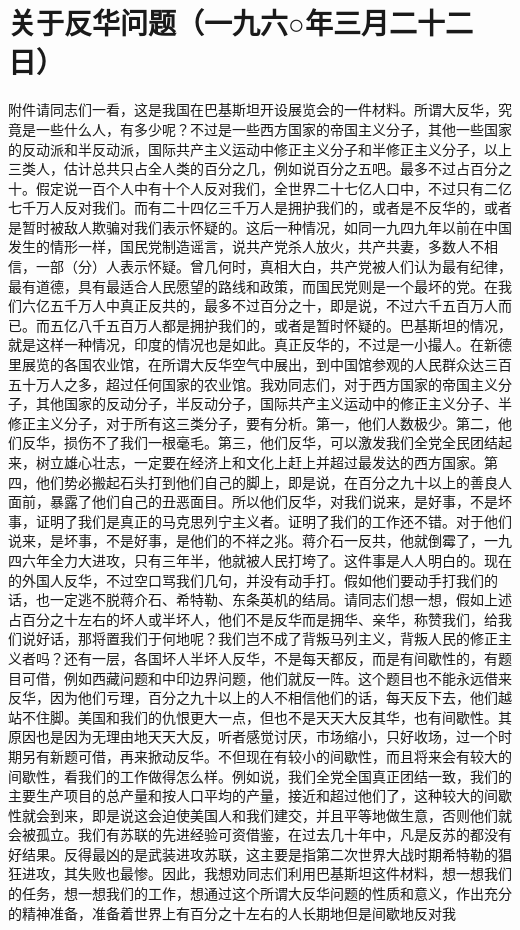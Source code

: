 \section[关于反华问题（一九六○年三月二十二日）]{关于反华问题（一九六○年三月二十二日）}


附件请同志们一看，这是我国在巴基斯坦开设展览会的一件材料。所谓大反华，究竟是一些什么人，有多少呢？不过是一些西方国家的帝国主义分子，其他一些国家的反动派和半反动派，国际共产主义运动中修正主义分子和半修正主义分子，以上三类人，估计总共只占全人类的百分之几，例如说百分之五吧。最多不过占百分之十。假定说一百个人中有十个人反对我们，全世界二十七亿人口中，不过只有二亿七千万人反对我们。而有二十四亿三千万人是拥护我们的，或者是不反华的，或者是暂时被敌人欺骗对我们表示怀疑的。这后一种情况，如同一九四九年以前在中国发生的情形一样，国民党制造谣言，说共产党杀人放火，共产共妻，多数人不相信，一部（分）人表示怀疑。曾几何时，真相大白，共产党被人们认为最有纪律，最有道德，具有最适合人民愿望的路线和政策，而国民党则是一个最坏的党。在我们六亿五千万人中真正反共的，最多不过百分之十，即是说，不过六千五百万人而已。而五亿八千五百万人都是拥护我们的，或者是暂时怀疑的。巴基斯坦的情况，就是这样一种情况，印度的情况也是如此。真正反华的，不过是一小撮人。在新德里展览的各国农业馆，在所谓大反华空气中展出，到中国馆参观的人民群众达三百五十万人之多，超过任何国家的农业馆。我劝同志们，对于西方国家的帝国主义分子，其他国家的反动分子，半反动分子，国际共产主义运动中的修正主义分子、半修正主义分子，对于所有这三类分子，要有分析。第一，他们人数极少。第二，他们反华，损伤不了我们一根毫毛。第三，他们反华，可以激发我们全党全民团结起来，树立雄心壮志，一定要在经济上和文化上赶上并超过最发达的西方国家。第四，他们势必搬起石头打到他们自己的脚上，即是说，在百分之九十以上的善良人面前，暴露了他们自己的丑恶面目。所以他们反华，对我们说来，是好事，不是坏事，证明了我们是真正的马克思列宁主义者。证明了我们的工作还不错。对于他们说来，是坏事，不是好事，是他们的不祥之兆。蒋介石一反共，他就倒霉了，一九四六年全力大进攻，只有三年半，他就被人民打垮了。这件事是人人明白的。现在的外国人反华，不过空口骂我们几句，并没有动手打。假如他们要动手打我们的话，也一定逃不脱蒋介石、希特勒、东条英机的结局。请同志们想一想，假如上述占百分之十左右的坏人或半坏人，他们不是反华而是拥华、亲华，称赞我们，给我们说好话，那将置我们于何地呢？我们岂不成了背叛马列主义，背叛人民的修正主义者吗？还有一层，各国坏人半坏人反华，不是每天都反，而是有间歇性的，有题目可借，例如西藏问题和中印边界问题，他们就反一阵。这个题目也不能永远借来反华，因为他们亏理，百分之九十以上的人不相信他们的话，每天反下去，他们越站不住脚。美国和我们的仇恨更大一点，但也不是天天大反其华，也有间歇性。其原因也是因为无理由地天天大反，听者感觉讨厌，市场缩小，只好收场，过一个时期另有新题可借，再来掀动反华。不但现在有较小的间歇性，而且将来会有较大的间歇性，看我们的工作做得怎么样。例如说，我们全党全国真正团结一致，我们的主要生产项目的总产量和按人口平均的产量，接近和超过他们了，这种较大的间歇性就会到来，即是说这会迫使美国人和我们建交，并且平等地做生意，否则他们就会被孤立。我们有苏联的先进经验可资借鉴，在过去几十年中，凡是反苏的都没有好结果。反得最凶的是武装进攻苏联，这主要是指第二次世界大战时期希特勒的猖狂进攻，其失败也最惨。因此，我想劝同志们利用巴基斯坦这件材料，想一想我们的任务，想一想我们的工作，想通过这个所谓大反华问题的性质和意义，作出充分的精神准备，准备着世界上有百分之十左右的人长期地但是间歇地反对我